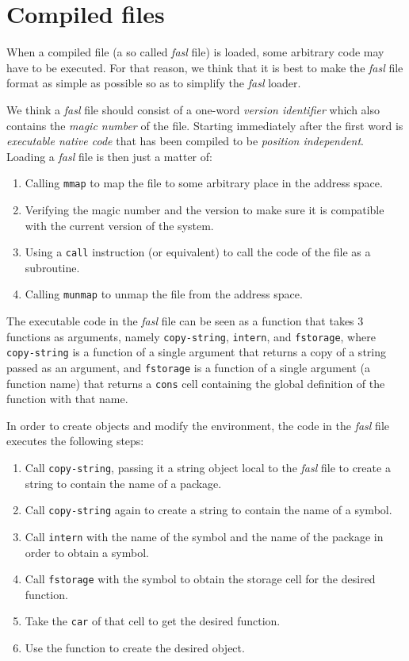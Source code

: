 \chapter{Compiled files}
\label{chap-compiled-files}

When a compiled file (a so called \emph{fasl} file) is loaded, some
arbitrary code may have to be executed.  For that reason, we think
that it is best to make the \emph{fasl} file format as simple as
possible so as to simplify the \emph{fasl} loader.

We think a \emph{fasl} file should consist of a one-word \emph{version
  identifier} which also contains the \emph{magic number} of the
file.  Starting immediately after the first word is \emph{executable
  native code} that has been compiled to be \emph{position
  independent}.  Loading a \emph{fasl} file is then just a matter of:

\begin{enumerate}
\item Calling \texttt{mmap} to map the file to some arbitrary place in
  the address space.
\item Verifying the magic number and the version to make sure it is
  compatible with the current version of the system. 
\item Using a \texttt{call} instruction (or equivalent) to call the
  code of the file as a subroutine.
\item Calling \texttt{munmap} to unmap the file from the address
  space. 
\end{enumerate}

The executable code in the \emph{fasl} file can be seen as a \cl{}
function that takes 3 functions as arguments, namely
\texttt{copy-string}, \texttt{intern}, and \texttt{fstorage}, where
\texttt{copy-string} is a function of a single argument that returns a
copy of a string passed as an argument, and \texttt{fstorage} is a
function of a single argument (a function name) that returns a
\texttt{cons} cell containing the global definition of the function
with that name.

In order to create objects and modify the environment, the code in the
\emph{fasl} file executes the following steps:

\begin{enumerate}
\item Call \texttt{copy-string}, passing it a string object local to
  the \emph{fasl} file to create a string to contain the
  name of a package.
\item Call \texttt{copy-string} again to create a string to contain
  the name of a symbol.
\item Call \texttt{intern} with the name of the symbol and the name of
  the package in order to obtain a symbol.
\item Call \texttt{fstorage} with the symbol to obtain the storage
  cell for the desired function.
\item Take the \texttt{car} of that cell to get the desired function.
\item Use the function to create the desired object.
\end{enumerate}

